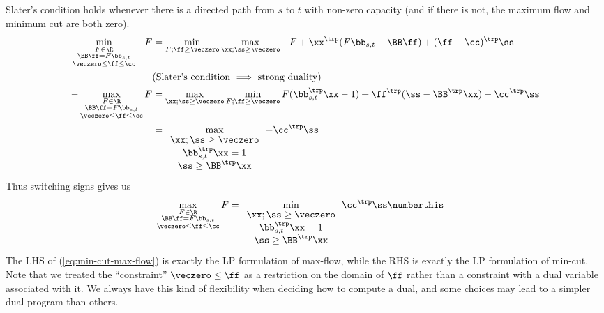 \begin{example}
  Slater's condition holds whenever there is a directed path from $s$ to $t$
  with non-zero capacity (and if there is not, the maximum flow and
  minimum cut are both zero).
  \begin{align*}
    \min_{\begin{subarray}{c} F\in\R \\ \BB\ff=F\bb_{s,t} \\ \veczero\leq\ff\leq\cc \end{subarray}} -F
    &= \min_{F;\ff\geq\veczero} \max_{\xx;\ss\geq\veczero} -F + \xx^\trp(F\bb_{s,t}-\BB\ff) + (\ff-\cc)^\trp\ss \\
    & \text{(Slater's condition $\implies$ strong duality)} \\
    -\max_{\begin{subarray}{c} F\in\R \\ \BB\ff=F\bb_{s,t} \\ \veczero\leq\ff\leq\cc \end{subarray}} F
    &= \max_{\xx;\ss\geq\veczero} \min_{F;\ff\geq\veczero} F(\bb_{s,t}^\trp\xx-1) + \ff^\trp(\ss-\BB^\trp\xx) -\cc^\trp\ss \\
    &= \max_{\begin{array}{c} \xx;\ss\geq\veczero \\ \bb_{s,t}^\trp\xx=1 \\ \ss\geq\BB^\trp\xx
             \end{array}} -\cc^\trp\ss
  \end{align*}
  Thus switching signs gives us
    \begin{align*}
    \max_{\begin{subarray}{c} F\in\R \\ \BB\ff=F\bb_{s,t} \\ \veczero\leq\ff\leq\cc \end{subarray}} F
    &= \min_{\begin{array}{c} \xx;\ss\geq\veczero \\ \bb_{s,t}^\trp\xx=1 \\ \ss\geq\BB^\trp\xx
    \end{array}} \cc^\trp\ss \numberthis \label{eq:min-cut-max-flow}
  \end{align*}
  The LHS of (\ref{eq:min-cut-max-flow}) is exactly the LP formulation
  of max-flow, while the RHS is exactly the LP formulation of min-cut.
  Note that we treated the ``constraint'' $ \veczero\leq\ff$ as a
  restriction on the domain of $\ff$ rather than a constraint with a
  dual variable associated with it.
  We always have this kind of flexibility when deciding how to compute
  a dual, and some choices may lead to a simpler dual program than others.
\end{example}

